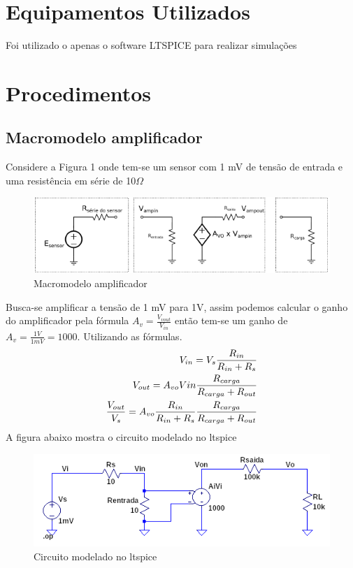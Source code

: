 \documentclass[a4paper, 12pt]{article}
\begin{document}

\section{Equipamentos Utilizados}
Foi utilizado o apenas o software LTSPICE para realizar simulações

\section{Procedimentos}
\subsection{ Macromodelo amplificador}
Considere a Figura 1 onde tem-se um sensor com 1 mV de tensão de entrada e uma resistência em série de 10$\Omega$  
\begin{figure}[H]
\centering
\includegraphics[scale=0.5]{modelo.png}
\caption{Macromodelo amplificador}
\label{Rotulo}
\end{figure}

Busca-se amplificar a tensão de 1 mV para  1V, assim podemos calcular o ganho do amplificador pela fórmula $A_v = \frac{V_{vout}}{V_{in}}$ então tem-se um ganho de  $A_v =\frac{1V}{1mV} = 1000 $.
Utilizando as fórmulas.
\begin{eqnarray*}
V_{in} = V_{s}\frac{R_{in}}{R_{in}+R_{s}}\newline
\\
V_{out}= A_{vo}Vin\frac{R_{carga}}{R_{carga}+R_{out}}\newline
\\
\frac{V_{out}}{V_s} = A_{vo}\frac{R_{in}}{R_{in}+R_{s}}\frac{R_{carga}}{R_{carga}+R_{out}}
\end{eqnarray*}
A figura abaixo mostra o circuito modelado no ltspice
\begin{figure}[H]
\centering
\includegraphics[scale=0.5]{ltspice.png}
\caption{Circuito modelado no ltspice}
\label{Rotulo}
\end{figure}
\end{document}
